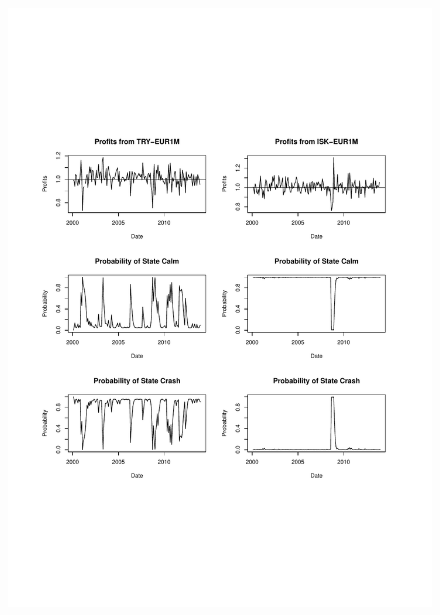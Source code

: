 \documentclass[12pt, a4paper, oneside]{article} %
\begin{document}
\begin{figure}[h!]
\centering
\includegraphics[scale = .80]{../Figures/2RegProb/ISKTRYEUR.pdf}
\end{figure}
\end{document}
